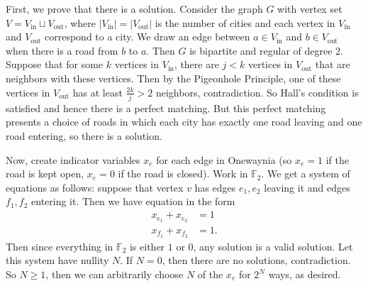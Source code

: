 First, we prove that there is a solution. Consider the graph $G$ with vertex set $V=V_{\text{in}}\sqcup V_{\text{out}}$, where $\left|V_{\text{in}}\right|=\left|V_{\text{out}}\right|$ is the number of cities and each vertex in $V_{\text{in}}$ and $V_{\text{out}}$ correspond to a city. We draw an edge between $a\in V_{\text{in}}$ and $b\in V_{\text{out}}$ when there is a road from $b$ to $a$. Then $G$ is bipartite and regular of degree $2$. Suppose that for some $k$ vertices in $V_{\text{in}}$, there are $j<k$ vertices in $V_{\text{out}}$ that are neighbors with these vertices. Then by the Pigeonhole Principle, one of these vertices in $V_{\text{out}}$ has at least $\frac{2k}{j}>2$ neighbors, contradiction. So Hall's condition is satisfied and hence there is a perfect matching. But this perfect matching presents a choice of roads in which each city has exactly one road leaving and one road entering, so there is a solution.

Now, create indicator variables $x_e$ for each edge in Onewaynia (so $x_e=1$ if the road is kept open, $x_e=0$ if the road is closed). Work in $\mathbb{F}_2$. We get a system of equations as follows: suppose that vertex $v$ has edges $e_1,e_2$ leaving it and edges $f_1,f_2$ entering it. Then we have equation in the form
\begin{align*}
	x_{e_1}+x_{e_2}&=1\\
	x_{f_1}+x_{f_2}&=1.
\end{align*}
Then since everything in $\mathbb{F}_2$ is either $1$ or $0$, any solution is a valid solution. Let this system have nullity $N$. If $N=0$, then there are no solutions, contradiction. So $N\geq1$, then we can arbitrarily choose $N$ of the $x_e$ for $2^N$ ways, as desired.